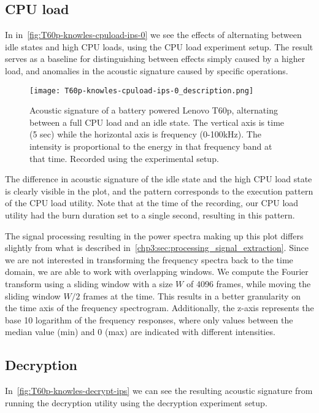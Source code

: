 \subsection{CPU load}\label{chp5:subsec:t60p_knowles_results_cpuload}
In in~\autoref{fig:T60p-knowles-cpuload-ips-0} we see the effects of alternating between idle states and high \gls{CPU} loads, using the \gls{CPU} load experiment setup.
The result serves as a baseline for distinguishing between effects simply caused by a higher load, and anomalies in the acoustic signature caused by specific operations.

\begin{figure}[ht]
    \centering
    \texttt{[image: T60p-knowles-cpuload-ips-0\_description.png]}
    \caption{Acoustic signature of a battery powered Lenovo T60p, alternating between a full \gls{CPU} load and an idle state.
        The vertical axis is time (5 sec) while the horizontal axis is frequency (0-100kHz).
        The intensity is proportional to the energy in that frequency band at that time.
        Recorded using the experimental setup.}
    \label{fig:T60p-knowles-cpuload-ips-0}
\end{figure}

The difference in acoustic signature of the idle state and the high \gls{CPU} load state is clearly visible in the plot, and the pattern corresponds to the execution pattern of the CPU load utility. 
Note that at the time of the recording, our \gls{CPU} load utility had the burn duration set to a single second, resulting in this pattern.

The signal processing resulting in the power spectra making up this plot differs slightly from what is described in~\autoref{chp3:sec:processing_signal_extraction}.
Since we are not interested in transforming the frequency spectra back to the time domain, we are able to work with overlapping windows.
We compute the Fourier transform using a sliding window with a size $W$ of 4096 frames, while moving the sliding window \({W/2}\) frames at the time.
This results in a better granularity on the time axis of the frequency spectrogram.
Additionally, the z-axis represents the base 10 logarithm of the frequency responses, where only values between the median value (min) and 0 (max) are indicated with different intensities.


\subsection{Decryption}\label{chp5:subsec:t60p_knowles_results_decryption}
In~\autoref{fig:T60p-knowles-decrypt-ips} we can see the resulting acoustic signature from running the decryption utility using the decryption experiment setup.

